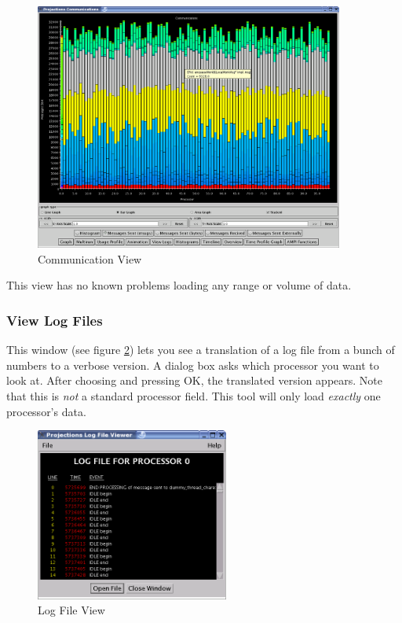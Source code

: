 \documentclass[10pt]{article}
\begin{document}
\begin{figure}[htb]
\center
\includegraphics[width=4.0in]{fig/commhistogram}
\caption{Communication View}
\label{communication}
\end{figure}

This view has no known problems loading any range or volume of data.

\subsubsection{View Log Files}

This window (see figure \ref{viewlog}) lets you see a translation of a
log file from a bunch of numbers to a verbose version.  A dialog box
asks which processor you want to look at.  After choosing and pressing
OK, the translated version appears. Note that this is {\it not} a
standard processor field. This tool will only load {\it exactly} one
processor's data.

\begin{figure}[htb]
\center
\includegraphics[width=2.5in]{fig/viewlog}
\caption{Log File View}
\label{viewlog}
\end{figure}
\end{document}
